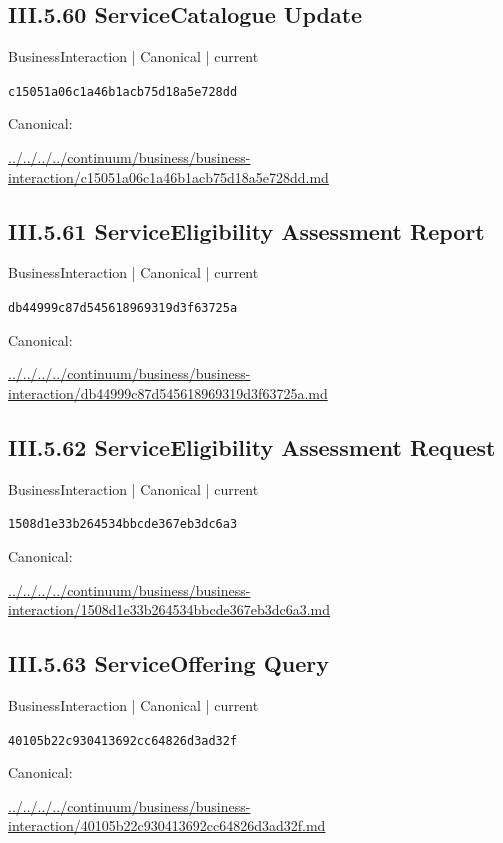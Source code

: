 \documentclass[10pt,a4paper]{article}
\begin{document}
\subsection*{III.5.60 ServiceCatalogue Update}
\label{element-c15051a06c1a46b1acb75d18a5e728dd}
{\small BusinessInteraction | Canonical | current}\par
\texttt{c15051a06c1a46b1acb75d18a5e728dd}\par
Canonical: \par
{\footnotesize\url{../../../../continuum/business/business-interaction/c15051a06c1a46b1acb75d18a5e728dd.md}}\par
\subsection*{III.5.61 ServiceEligibility Assessment Report}
\label{element-db44999c87d545618969319d3f63725a}
{\small BusinessInteraction | Canonical | current}\par
\texttt{db44999c87d545618969319d3f63725a}\par
Canonical: \par
{\footnotesize\url{../../../../continuum/business/business-interaction/db44999c87d545618969319d3f63725a.md}}\par
\subsection*{III.5.62 ServiceEligibility Assessment Request}
\label{element-1508d1e33b264534bbcde367eb3dc6a3}
{\small BusinessInteraction | Canonical | current}\par
\texttt{1508d1e33b264534bbcde367eb3dc6a3}\par
Canonical: \par
{\footnotesize\url{../../../../continuum/business/business-interaction/1508d1e33b264534bbcde367eb3dc6a3.md}}\par
\subsection*{III.5.63 ServiceOffering Query}
\label{element-40105b22c930413692cc64826d3ad32f}
{\small BusinessInteraction | Canonical | current}\par
\texttt{40105b22c930413692cc64826d3ad32f}\par
Canonical: \par
{\footnotesize\url{../../../../continuum/business/business-interaction/40105b22c930413692cc64826d3ad32f.md}}\par
\end{document}

